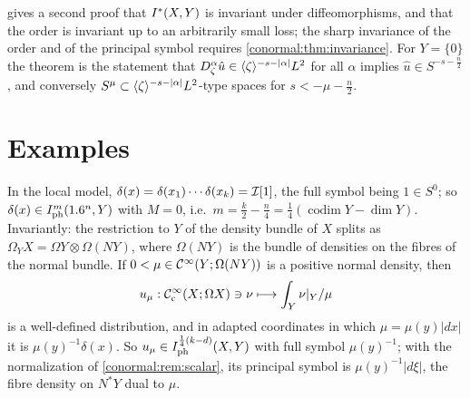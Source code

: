 \begin{remark}
   gives a second proof that $I^{*}(X,Y)$ is invariant
  under diffeomorphisms, and that the order is invariant up to an arbitrarily
  small loss; the sharp invariance of the order and of the principal symbol
  requires \cref{conormal:thm:invariance}.  For $Y=\{0\}$ the theorem is the
  statement that $D_\zeta^\alpha\hat u\in\langle \zeta\rangle^{-s-|\alpha|}L^2$ for all
  $\alpha$ implies $\hat u\in S^{-s-\frac n2}$, and conversely
  $S^{\mu}\subset\langle \zeta\rangle^{-s-|\alpha|}L^2$-type spaces for $s<-\mu-\frac n2$.
\end{remark}

\section{Examples}\label{conormal:sec:examples}

\begin{example}\label{conormal:ex:delta}
  In the local model, $\delta(x)=\delta(x_1)\cdots\delta(x_k)=\mathcal{I}[1]$, the full
  symbol being $1\in S^0$; so $\delta(x)\in I^{m}_{\mathrm{ph}}(1.6^n,Y)$ with
  $M=0$, i.e.\ $m=\frac k2-\frac n4=\frac14(\operatorname{codim}Y-\dim Y)$.
  Invariantly: the restriction to $Y$ of the density bundle of $X$ splits as
  $\Omega_YX=\Omega Y\otimes\Omega(NY)$, where $\Omega(NY)$ is the bundle of
  densities on the fibres of the normal bundle.  If $0<\mu\in\mathcal{C}^\infty(Y;\Omega(NY))$
  is a positive normal density, then
  \begin{equation*}
    u_\mu:\mathcal{C}^\infty_{\mathrm{c}}(X;\Omega X)\ni\nu\longmapsto\int_Y\nu|_Y/\mu
  \end{equation*}
  is a well-defined distribution, and in adapted coordinates in which
  $\mu=\mu(y)|dx|$ it is $\mu(y)^{-1}\delta(x)$.  So $u_\mu\in
  I^{\frac14(k-d)}_{\mathrm{ph}}(X,Y)$ with full symbol $\mu(y)^{-1}$; with the
  normalization of \cref{conormal:rem:scalar}, its principal symbol is
  $\mu(y)^{-1}|d\xi|$, the fibre density on $N^*Y$ dual to $\mu$.
\end{example}


